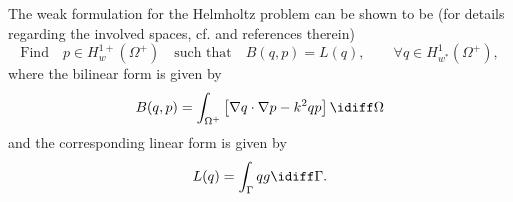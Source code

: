 The weak formulation for the Helmholtz problem can be shown to be (for details regarding the involved spaces, cf. \cite{Venas2018iao} and references therein)
\begin{equation}
	\text{Find} \quad p\in H_w^{1+}(\Omega^+)\quad\text{such that}\quad B(q,p) = L(q),\qquad \forall q\in H_{w^*}^1(\Omega^+),
\end{equation}
where the bilinear form is given by
\begin{equation}\label{Eq5:bilinear}
	B(q,p) = \int_{\Omega^+} \left[\nabla q\cdot\nabla p-  k^2qp\right]\idiff\Omega
\end{equation}
and the corresponding linear form is given by
\begin{equation*}
	L(q) = \int_{\Gamma} qg\idiff\Gamma.
\end{equation*}

